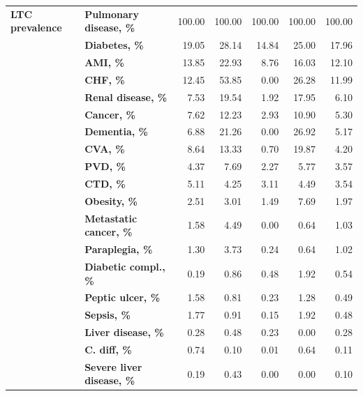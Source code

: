 \documentclass[11pt]{article}
\begin{document}
\begin{table}
{\begin{tabular}{llrrrrr}
        \textbf{LTC prevalence} & \textbf{Pulmonary disease, \%} &   100.00 &   100.00 &   100.00 &    100.00 &     100.00 \\
               & \textbf{Diabetes, \%} &    19.05 &    28.14 &    14.84 &     25.00 &      17.96 \\
               & \textbf{AMI, \%} &    13.85 &    22.93 &     8.76 &     16.03 &      12.10 \\
               & \textbf{CHF, \%} &    12.45 &    53.85 &     0.00 &     26.28 &      11.99 \\
               & \textbf{Renal disease, \%} &     7.53 &    19.54 &     1.92 &     17.95 &       6.10 \\
               & \textbf{Cancer, \%} &     7.62 &    12.23 &     2.93 &     10.90 &       5.30 \\
               & \textbf{Dementia, \%} &     6.88 &    21.26 &     0.00 &     26.92 &       5.17 \\
               & \textbf{CVA, \%} &     8.64 &    13.33 &     0.70 &     19.87 &       4.20 \\
               & \textbf{PVD, \%} &     4.37 &     7.69 &     2.27 &      5.77 &       3.57 \\
               & \textbf{CTD, \%} &     5.11 &     4.25 &     3.11 &      4.49 &       3.54 \\
               & \textbf{Obesity, \%} &     2.51 &     3.01 &     1.49 &      7.69 &       1.97 \\
               & \textbf{Metastatic cancer, \%} &     1.58 &     4.49 &     0.00 &      0.64 &       1.03 \\
               & \textbf{Paraplegia, \%} &     1.30 &     3.73 &     0.24 &      0.64 &       1.02 \\
               & \textbf{Diabetic compl., \%} &     0.19 &     0.86 &     0.48 &      1.92 &       0.54 \\
               & \textbf{Peptic ulcer, \%} &     1.58 &     0.81 &     0.23 &      1.28 &       0.49 \\
               & \textbf{Sepsis, \%} &     1.77 &     0.91 &     0.15 &      1.92 &       0.48 \\
               & \textbf{Liver disease, \%} &     0.28 &     0.48 &     0.23 &      0.00 &       0.28 \\
               & \textbf{C. diff, \%} &     0.74 &     0.10 &     0.01 &      0.64 &       0.11 \\
               & \textbf{Severe liver disease, \%} &     0.19 &     0.43 &     0.00 &      0.00 &       0.10 \\

\end{tabular}}
\end{table}
\end{document}

